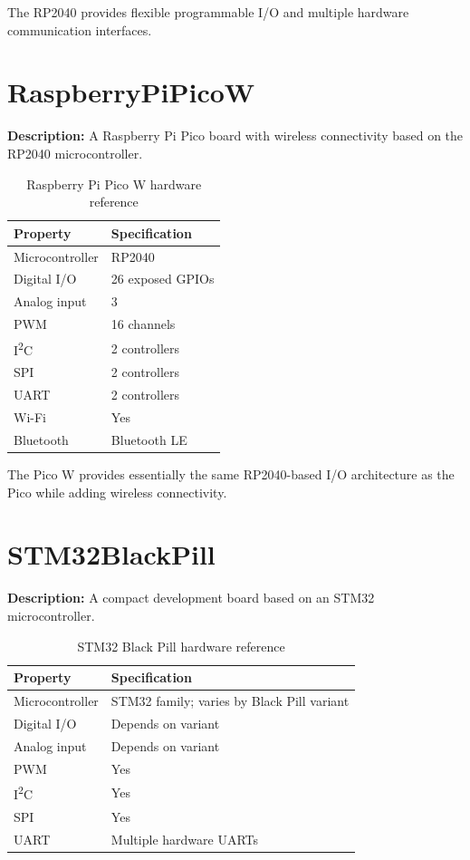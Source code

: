The RP2040 provides flexible programmable I/O and multiple hardware
communication interfaces.

\newpage
\section{RaspberryPiPicoW}

\textbf{Description:} A Raspberry Pi Pico board with wireless connectivity
based on the RP2040 microcontroller.

\begin{table}[H]
\centering
\caption{Raspberry Pi Pico W hardware reference}
\label{tab:board-pico-w}
\begin{tabular}{ll}
\toprule
\textbf{Property} & \textbf{Specification} \\
\midrule
Microcontroller & RP2040 \\
Digital I/O & 26 exposed GPIOs \\
Analog input & 3 \\
PWM & 16 channels \\
I\textsuperscript{2}C & 2 controllers \\
SPI & 2 controllers \\
UART & 2 controllers \\
Wi-Fi & Yes \\
Bluetooth & Bluetooth LE \\
\bottomrule
\end{tabular}
\end{table}

The Pico W provides essentially the same RP2040-based I/O architecture as
the Pico while adding wireless connectivity.

\section{STM32BlackPill}

\textbf{Description:} A compact development board based on an STM32
microcontroller.

\begin{table}[H]
\centering
\caption{STM32 Black Pill hardware reference}
\label{tab:board-black-pill}
\begin{tabular}{ll}
\toprule
\textbf{Property} & \textbf{Specification} \\
\midrule
Microcontroller & STM32 family; varies by Black Pill variant \\
Digital I/O & Depends on variant \\
Analog input & Depends on variant \\
PWM & Yes \\
I\textsuperscript{2}C & Yes \\
SPI & Yes \\
UART & Multiple hardware UARTs \\
\bottomrule
\end{tabular}
\end{table}

